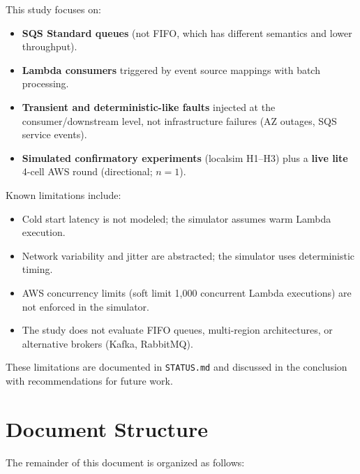 This study focuses on:
\begin{itemize}
    \item \textbf{SQS Standard queues} (not FIFO, which has different semantics and lower throughput).
    \item \textbf{Lambda consumers} triggered by event source mappings with batch processing.
    \item \textbf{Transient and deterministic-like faults} injected at the consumer/downstream level, not infrastructure failures (AZ outages, SQS service events).
    \item \textbf{Simulated confirmatory experiments} (localsim H1--H3) plus a \textbf{live lite} 4-cell AWS round (directional; $n{=}1$).
\end{itemize}

Known limitations include:
\begin{itemize}
    \item Cold start latency is not modeled; the simulator assumes warm Lambda execution.
    \item Network variability and jitter are abstracted; the simulator uses deterministic timing.
    \item AWS concurrency limits (soft limit 1,000 concurrent Lambda executions) are not enforced in the simulator.
    \item The study does not evaluate FIFO queues, multi-region architectures, or alternative brokers (Kafka, RabbitMQ).
\end{itemize}

These limitations are documented in \texttt{STATUS.md} and discussed in the conclusion with recommendations for future work.

\section{Document Structure}

The remainder of this document is organized as follows:

